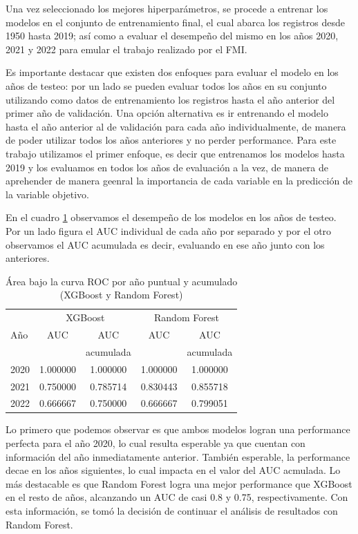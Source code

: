 \documentclass{article}
\begin{document}
Una vez seleccionado los mejores hiperparámetros, se procede a entrenar los modelos en el
conjunto de entrenamiento final, el cual abarca los registros desde 1950 hasta 2019; así
como a evaluar el desempeño del mismo en los años 2020, 2021 y 2022 para emular el trabajo
realizado por el FMI.

Es importante destacar que existen dos enfoques para evaluar el modelo en los años de
testeo: por un lado se pueden evaluar todos los años en su conjunto utilizando como datos
de entrenamiento los registros hasta el año anterior del primer año de validación. Una
opción alternativa es ir entrenando el modelo hasta el año anterior al de validación para
cada año individualmente, de manera de poder utilizar todos los años anteriores y no 
perder performance. Para este trabajo utilizamos el primer enfoque, es decir que entrenamos los 
modelos hasta 2019 y los evaluamos en todos los años de evaluación a la vez, de manera de
aprehender de manera geenral la importancia de cada variable en la predicción de la
variable objetivo.

En el cuadro \ref{tab:performance} observamos el desempeño de los modelos en los años
de testeo. Por un lado figura el AUC individual de cada año por separado y por el otro
observamos el AUC acumulada es decir, evaluando en ese año junto con los anteriores.

\begin{table}[H]
  \centering
    \begin{tabular}{lcccc}
      \toprule
      & \multicolumn{2}{c}{XGBoost} & \multicolumn{2}{c}{Random Forest} \\
      Año  & AUC      & AUC      & AUC      & AUC  \\
           &          & acumulada&          & acumulada \\
      \midrule
      2020 & 1.000000 & 1.000000 & 1.000000 & 1.000000 \\
      2021 & 0.750000 & 0.785714 & 0.830443 & 0.855718 \\
      2022 & 0.666667 & 0.750000 & 0.666667 & 0.799051 \\
      \bottomrule
    \end{tabular}
  \caption{Área bajo la curva ROC por año puntual y acumulado (XGBoost y 
  Random Forest) \label{tab:performance}}
\end{table}

Lo primero que podemos observar es que ambos modelos logran una performance perfecta 
para el año 2020, lo cual resulta esperable ya que cuentan con información del año 
inmediatamente anterior. También esperable, la performance decae en los años siguientes, 
lo cual impacta en el valor del AUC acmulada. Lo más destacable es que Random 
Forest logra una mejor performance que XGBoost en el resto de años, alcanzando un AUC de 
casi 0.8 y 0.75, respectivamente. Con esta información, se tomó la decisión de continuar 
el análisis de resultados con Random Forest.
\end{document}

